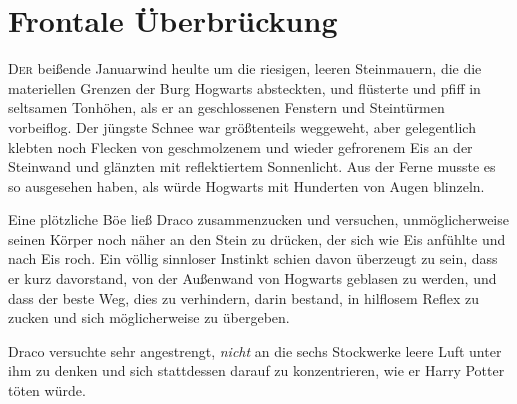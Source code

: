 \chapter{Frontale Überbrückung}

\lettrine{D}{er} beißende Januarwind heulte um die riesigen, leeren Steinmauern, die die materiellen Grenzen der Burg Hogwarts absteckten, und flüsterte und pfiff in seltsamen Tonhöhen, als er an geschlossenen Fenstern und Steintürmen vorbeiflog. Der jüngste Schnee war größtenteils weggeweht, aber gelegentlich klebten noch Flecken von geschmolzenem und wieder gefrorenem Eis an der Steinwand und glänzten mit reflektiertem Sonnenlicht. Aus der Ferne musste es so ausgesehen haben, als würde Hogwarts mit Hunderten von Augen blinzeln.

Eine plötzliche Böe ließ Draco zusammenzucken und versuchen, unmöglicherweise seinen Körper noch näher an den Stein zu drücken, der sich wie Eis anfühlte und nach Eis roch. Ein völlig sinnloser Instinkt schien davon überzeugt zu sein, dass er kurz davorstand, von der Außenwand von Hogwarts geblasen zu werden, und dass der beste Weg, dies zu verhindern, darin bestand, in hilflosem Reflex zu zucken und sich möglicherweise zu übergeben.

Draco versuchte sehr angestrengt, \emph{nicht} an die sechs Stockwerke leere Luft unter ihm zu denken und sich stattdessen darauf zu konzentrieren, wie er Harry Potter töten würde.


